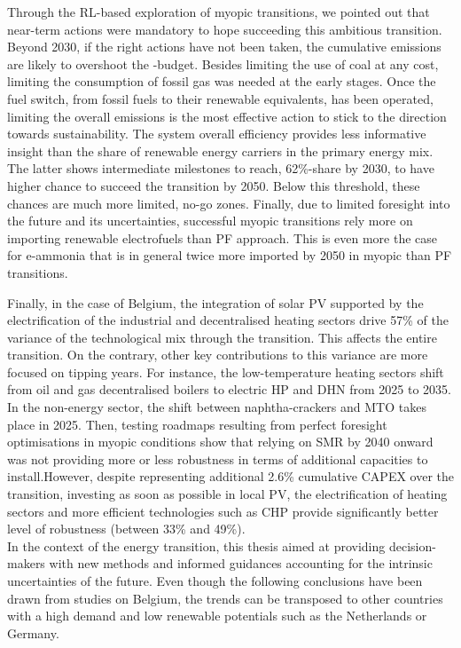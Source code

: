 Through the \gls{RL}-based exploration of myopic transitions, we pointed out that near-term actions were mandatory to hope succeeding this ambitious transition.  Beyond 2030, if the right actions have not been taken, the cumulative emissions are likely to overshoot the -budget. Besides limiting the use of coal at any cost, limiting the consumption of fossil gas was needed at the early stages. Once the fuel switch, from fossil fuels to their renewable equivalents, has been operated, limiting the overall emissions is the most effective action to stick to the direction towards sustainability. The system overall efficiency provides less informative insight than the share of renewable energy carriers in the primary energy mix. The latter shows intermediate milestones to reach, 62\%-share by 2030, to have higher chance to succeed the transition by 2050. Below this threshold, these chances are much more limited, \ie no-go zones. Finally, due to limited foresight into the future and its uncertainties, successful myopic transitions rely more on importing renewable electrofuels than PF approach. This is even more the case for e-ammonia that is in general twice more imported by 2050 in myopic than PF transitions.

Finally, in the case of Belgium, the integration of solar \gls{PV} supported by the electrification of the industrial and decentralised heating sectors drive 57\% of the variance of the technological mix through the transition. This affects the entire transition. On the contrary, other key contributions to this variance are more focused on tipping years. For instance, the low-temperature heating sectors shift from oil and gas decentralised boilers to electric \acrfull{HP} and \acrfull{DHN} from 2025 to 2035. In the non-energy sector, the shift between naphtha-crackers and \acrfull{MTO} takes place in 2025. Then, testing roadmaps resulting from perfect foresight optimisations in myopic conditions show that relying on \gls{SMR} by 2040 onward was not providing more or less robustness in terms of additional capacities to install.However, despite representing additional 2.6\% cumulative CAPEX over the transition, investing as soon as possible in local \gls{PV}, the electrification of heating sectors and more efficient technologies such as \acrfull{CHP} provide significantly better level of robustness (between 33\% and 49\%).\\


In the context of the energy transition, this thesis aimed at providing decision-makers with new methods and informed guidances accounting for the intrinsic uncertainties of the future. Even though the following conclusions have been drawn from studies on Belgium, the trends can be transposed to other countries with a high demand and low renewable potentials such as the Netherlands or Germany. 

